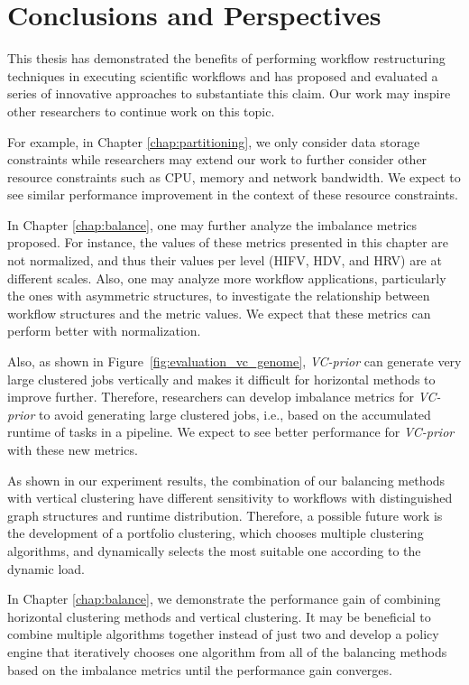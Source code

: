 \section{Conclusions and Perspectives}

This thesis has demonstrated the benefits of performing workflow restructuring techniques in executing scientific workflows and has proposed and evaluated a series of innovative approaches to substantiate this claim. Our work may inspire other researchers to continue work on this topic.  

For example, in Chapter \ref{chap:partitioning}, we only consider data storage constraints while researchers may extend our work to further consider other resource constraints such as CPU, memory and network bandwidth. We expect to see similar performance improvement in the context of these resource constraints. 

In Chapter \ref{chap:balance},  one may further analyze the imbalance metrics proposed. For instance, the values of these metrics presented in this chapter are not normalized, and thus their values per level (HIFV, HDV, and HRV) are at different scales. Also, one may analyze more workflow applications, particularly the ones with asymmetric structures, to investigate the relationship between workflow structures and the metric values. We expect that these metrics can perform better with normalization. 

Also, as shown in Figure~\ref{fig:evaluation_vc_genome}, \emph{VC-prior} can generate very large clustered jobs vertically and makes it difficult for horizontal methods to improve further. Therefore, researchers can develop imbalance metrics for \emph{VC-prior} to avoid generating large clustered jobs, i.e., based on the accumulated runtime of tasks in a pipeline. We expect to see better performance for \emph{VC-prior} with these new metrics. 


As shown in our experiment results, the combination of our balancing methods with vertical clustering have different sensitivity to workflows with distinguished graph structures and runtime distribution. Therefore, a possible future work is the development of a portfolio clustering, which chooses multiple clustering algorithms, and dynamically selects the most suitable one according to the dynamic load.

In Chapter \ref{chap:balance}, we demonstrate the performance gain of combining horizontal clustering methods and vertical clustering. It may be beneficial to combine multiple algorithms together instead of just two and develop a policy engine that iteratively chooses one algorithm from all of the balancing methods based on the imbalance metrics until the performance gain converges. 


